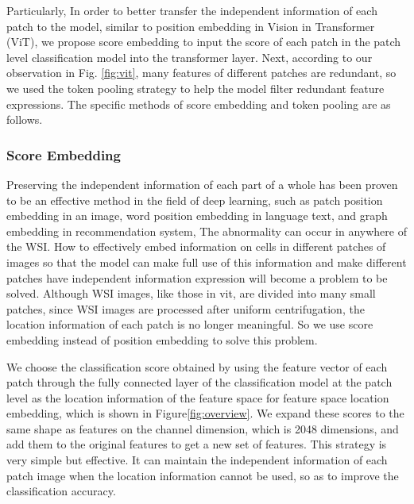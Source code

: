 
Particularly, In order to better transfer the independent information of each patch to the model, similar to position embedding in Vision in Transformer (ViT)\cite{dosovitskiy2020image}, we propose score embedding to input the score of each patch in the patch level classification model into the transformer layer. Next, according to our observation in Fig. \ref{fig:vit}, many features of different patches are redundant, so we used the token pooling strategy to help the model filter redundant feature expressions. The specific methods of score embedding and token pooling are as follows.



\subsubsection{Score Embedding}
Preserving the independent information of each part of a whole has been proven to be an effective method in the field of deep learning, such as patch position embedding in an image\cite{dosovitskiy2020image}, word position embedding in language text\cite{vaswani2017attention}, and graph embedding in recommendation system\cite{goyal2018graph}, 
The abnormality can occur in anywhere of the WSI. 
How to effectively embed information on cells in different patches of images so that the model can make full use of this information and make different patches have independent information expression will become a problem to be solved. Although WSI images, like those in vit, are divided into many small patches, since WSI images are processed after uniform centrifugation, the location information of each patch is no longer meaningful. So we use score embedding instead of position embedding to solve this problem.



We choose the classification score obtained by using the feature vector of each patch through the fully connected layer of the classification model at the patch level as the location information of the feature space for feature space location embedding, which is shown in Figure\ref{fig:overview}. 
We expand these scores to the same shape as features on the channel dimension, which is 2048 dimensions, and add them to the original features to get a new set of features.
This strategy is very simple but effective. It can maintain the independent information of each patch image when the location information cannot be used, so as to improve the classification accuracy.


